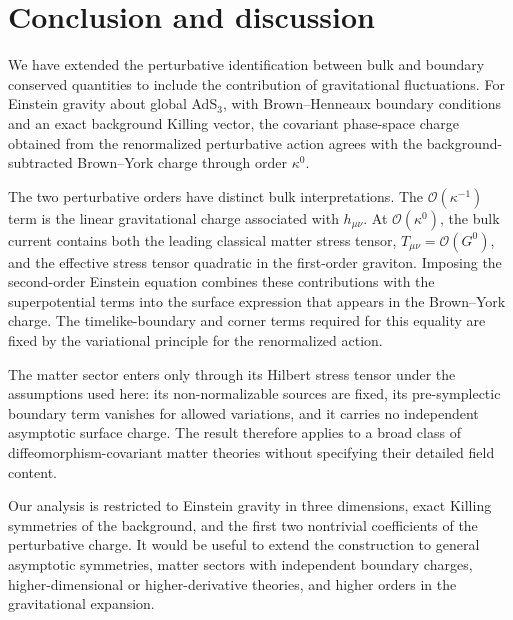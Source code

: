 \section{Conclusion and discussion}\label{sec:conclusion}

We have extended the perturbative identification between bulk and boundary conserved quantities to include the contribution of gravitational fluctuations. For Einstein gravity about global AdS$_3$, with Brown--Henneaux boundary conditions and an exact background Killing vector, the covariant phase-space charge obtained from the renormalized perturbative action agrees with the background-subtracted Brown--York charge through order $\kappa ^0$.

The two perturbative orders have distinct bulk interpretations. The $\mathcal{O}(\kappa^{-1})$ term is the linear gravitational charge associated with $h_{\mu\nu}$. At $\mathcal{O}(\kappa^0)$, the bulk current contains both the leading classical matter stress tensor, $T_{\mu\nu}=\mathcal{O}(G^0)$, and the effective stress tensor quadratic in the first-order graviton. Imposing the second-order Einstein equation combines these contributions with the superpotential terms into the surface expression that appears in the Brown--York charge. The timelike-boundary and corner terms required for this equality are fixed by the variational principle for the renormalized action.

The matter sector enters only through its Hilbert stress tensor under the assumptions used here: its non-normalizable sources are fixed, its pre-symplectic boundary term vanishes for allowed variations, and it carries no independent asymptotic surface charge. The result therefore applies to a broad class of diffeomorphism-covariant matter theories without specifying their detailed field content.

Our analysis is restricted to Einstein gravity in three dimensions, exact Killing symmetries of the background, and the first two nontrivial coefficients of the perturbative charge. It would be useful to extend the construction to general asymptotic symmetries, matter sectors with independent boundary charges, higher-dimensional or higher-derivative theories, and higher orders in the gravitational expansion.

